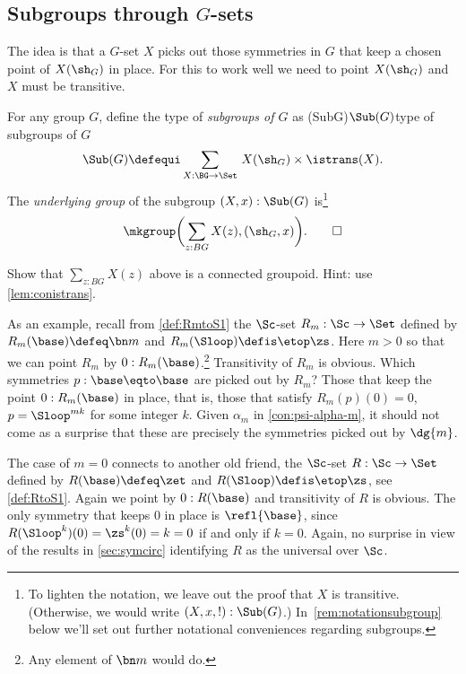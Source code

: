\subsection{Subgroups through $G$-sets}

The idea is that a $G$-set $X$ picks out those symmetries in $G$
that keep a chosen point of $X(\sh_G)$ in place. For this to work well
we need to point $X(\sh_G)$ and $X$ must be transitive.

\begin{definition}\label{def:set-of-subgroups}
  For any group $G$, define the type of \emph{subgroups of $G$} as%
  \glossary(SubG){$\protect\Sub(G)$}{type of subgroups of $G$}
  \[
    \Sub(G)\defequi\sum_{X:\BG\to\Set}{\,}X(\sh_G)
    \times\istrans(X).
  \]
  The \emph{underlying group} of the subgroup $(X,x) : \Sub(G)$ is\footnote{%
    To lighten the notation, we leave out the proof that $X$ is transitive.
    (Otherwise, we would write $(X,x,!):\Sub(G)$.)
    In~\cref{rem:notationsubgroup} below we'll set out further notational
    conveniences regarding subgroups.}
  \[
    \mkgroup \biggl(\sum_{z:BG}X(z),(\sh_G,x)\biggr).\qedhere
  \]
\end{definition}

\begin{xca}\label{xca:group-Xx!}
Show that $\sum_{z:BG}X(z)$ above is a connected groupoid.
Hint: use \cref{lem:conistrans}.
\end{xca}

As an example, recall from \cref{def:RmtoS1} the $\Sc$-set
$R_m : \Sc\to\Set$ defined by $R_m(\base) \defeq \bn m$ and
$R_m(\Sloop) \defis \etop\zs$. Here $m>0$ so that we can point
$R_m$ by $0: R_m(\base)$.\footnote{Any element of $\bn m$ would do.}
Transitivity of $R_m$ is obvious.
Which symmetries $p: \base\eqto\base$ are picked out by $R_m$?
Those that keep the point $0: R_m(\base)$ in place, that is,
those that satisfy $R_m(p)(0)=0$, \ie $p=\Sloop^{mk}$ for some integer $k$.
Given $\alpha_m$ in \cref{con:psi-alpha-m}, it should not come as a
surprise that these are precisely the symmetries picked out by $\dg{m}$.

The case of $m=0$ connects to another old friend, the $\Sc$-set
$R : \Sc\to\Set$ defined by $R(\base) \defeq \zet$ and
$R(\Sloop) \defis \etop\zs$, see \cref{def:RtoS1}.
Again we point by $0: R(\base)$ and transitivity of $R$ is obvious.
The only symmetry that keeps $0$ in place is $\refl{\base}$,
since $R(\Sloop^k)(0) = \zs^k(0) = k = 0$ if and only if $k=0$.
Again, no surprise in view of the results in \cref{sec:symcirc}
identifying $R$ as the universal \covering over $\Sc$.

